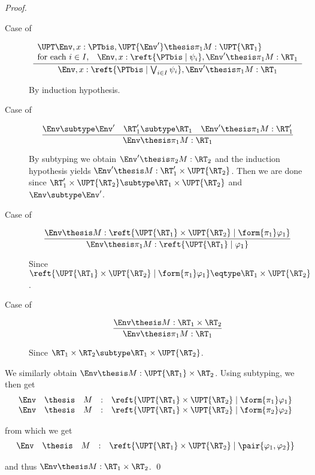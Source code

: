 \begin{proof}
\begin{description}
\item[Case of]
\[
\dfrac{
  \begin{array}{l}
  \UPT\Env, x:\PTbis, \UPT{\Env'} \thesis \pi_1 M : \UPT{\RT_1}
  \\
  \text{for each $i \in I$,}\quad
  \Env, x:\reft{\PTbis \mid \psi_i},\Env' \thesis \pi_1 M : \RT_1
  \end{array}}
  {\Env, x : \reft{\PTbis \mid \bigvee_{i \in I} \psi_i} , \Env' \thesis \pi_1 M : \RT_1}
\]

By induction hypothesis.

\item[Case of]
\[
\dfrac{
  \Env \subtype \Env'
  \quad 
  \RT'_1 \subtype \RT_1
  \quad
  \Env' \thesis \pi_1 M : \RT'_1}
  {\Env \thesis \pi_1 M : \RT_1}
\]


By subtyping we obtain
$\Env' \thesis \pi_2 M : \RT_2$
and the induction hypothesis yields
$\Env' \thesis M : \RT'_1 \times \UPT{\RT_2}$.
Then we are done since
$\RT'_1 \times \UPT{\RT_2} \subtype \RT_1 \times \UPT{\RT_2}$
and $\Env \subtype \Env'$.


\item[Case of]
\[
\dfrac{\Env \thesis M : \reft{\UPT{\RT_1} \times \UPT{\RT_2} \mid \form{\pi_1} \varphi_1}}
  {\Env \thesis \pi_1 M : \reft{\UPT{\RT_1} \mid \varphi_1}}
\]

Since
\(
  \reft{\UPT{\RT_1} \times \UPT{\RT_2} \mid \form{\pi_1} \varphi_1}
  \eqtype
  \RT_1 \times \UPT{\RT_2}
\).

\item[Case of]
\[
\dfrac{\Env \thesis M : \RT_1 \times \RT_2}
  {\Env \thesis \pi_1 M : \RT_1}
\]

Since
$\RT_1 \times \RT_2 \subtype \RT_1 \times \UPT{\RT_2}$.
\end{description}

\noindent
We similarly obtain
$\Env \thesis M : \UPT{\RT_1} \times \RT_2$.
Using subtyping, we then get
\[
\begin{array}{*{5}{l}}
  \Env
& \thesis
& M
& :
& \reft{\UPT{\RT_1} \times \UPT{\RT_2} \mid \form{\pi_1}\varphi_1}
\\

  \Env
& \thesis
& M
& :
& \reft{\UPT{\RT_1} \times \UPT{\RT_2} \mid  \form{\pi_2}\varphi_2}
\end{array}
\]

\noindent
from which we get
\[
\begin{array}{*{5}{l}}
  \Env
& \thesis
& M
& :
& \reft{\UPT{\RT_1} \times \UPT{\RT_2} \mid \pair{\varphi_1,\varphi_2}}
\end{array}
\]

\noindent
and thus
$\Env \thesis M : \RT_1 \times \RT_2$.
\qed
\end{proof}

